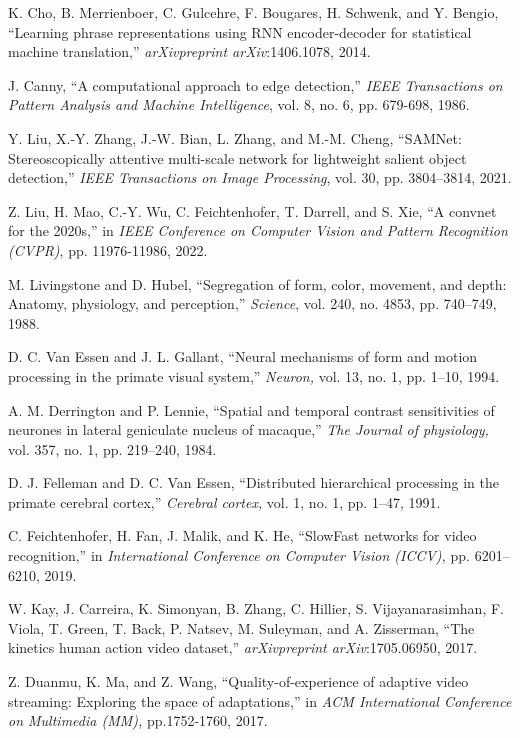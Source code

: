 \documentclass[journal]{IEEEtran}
\begin{document}
\begin{thebibliography}{5}
K. Cho, B. Merrienboer, C. Gulcehre, F. Bougares, H. Schwenk, and Y. Bengio, ``Learning phrase representations using RNN encoder-decoder for statistical machine translation,'' \emph{arXivpreprint arXiv}:1406.1078, 2014.

J. Canny, ``A computational approach to edge detection,'' \emph{IEEE Transactions on Pattern Analysis and Machine Intelligence}, vol. 8, no. 6, pp. 679-698, 1986.

Y. Liu, X.-Y. Zhang, J.-W. Bian, L. Zhang, and M.-M. Cheng, ``SAMNet: Stereoscopically attentive multi-scale network for lightweight salient object detection,'' \emph{IEEE Transactions on Image Processing}, vol. 30, pp. 3804–3814, 2021.

Z. Liu, H. Mao, C.-Y. Wu, C. Feichtenhofer, T. Darrell, and S. Xie, ``A convnet for the 2020s,'' in \emph{IEEE Conference on Computer Vision and Pattern Recognition (CVPR)}, pp. 11976-11986, 2022.

M. Livingstone and D. Hubel, ``Segregation of form, color, movement, and depth: Anatomy, physiology, and perception,'' \emph{Science}, vol. 240, no. 4853, pp. 740–749, 1988.

D. C. Van Essen and J. L. Gallant, ``Neural mechanisms of form and motion processing in the primate visual system,'' \emph{Neuron,} vol. 13, no. 1, pp. 1–10, 1994.

A. M. Derrington and P. Lennie, ``Spatial and temporal contrast sensitivities of neurones in lateral geniculate nucleus of macaque,'' \emph{The Journal of physiology,} vol. 357, no. 1, pp. 219–240, 1984.

D. J. Felleman and D. C. Van Essen, ``Distributed hierarchical processing in the primate cerebral cortex,'' \emph{Cerebral cortex,} vol. 1, no. 1, pp. 1–47, 1991.

C. Feichtenhofer, H. Fan, J. Malik, and K. He, ``SlowFast networks for video recognition,'' in \emph{International Conference on Computer Vision (ICCV),} pp. 6201–6210, 2019.

W. Kay, J. Carreira, K. Simonyan, B. Zhang, C. Hillier, S. Vijayanarasimhan, F. Viola, T. Green, T. Back, P. Natsev, M. Suleyman, and A. Zisserman, ``The kinetics human action video dataset,'' \emph{arXivpreprint arXiv}:1705.06950, 2017.

Z. Duanmu, K. Ma, and Z. Wang, ``Quality-of-experience of adaptive video streaming: Exploring the space of adaptations,'' in \emph{ACM International Conference on Multimedia (MM),} pp.1752-1760, 2017.


\end{thebibliography}
\end{document}

